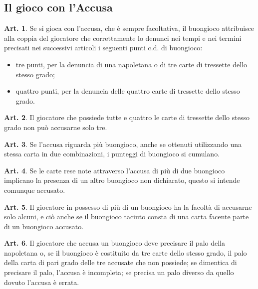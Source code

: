 \documentclass[italian,a4paper]{article}
\theoremstyle{definition}
\newtheorem{art}{Art.}
\begin{document}
\subsection{Il gioco con l'Accusa}
\begin{art}
Se si gioca con l'accusa, che è sempre facoltativa, il buongioco attribuisce alla coppia del giocatore che correttamente lo denunci nei tempi e nei termini precisati nei successivi articoli i seguenti punti c.d. di buongioco:
\begin{itemize}
\item    tre punti, per la denuncia di una napoletana o di tre carte di tressette dello stesso grado;
\item    quattro punti, per la denuncia delle quattro carte di tressette dello stesso grado.
    \end{itemize}
\end{art}
\begin{art}
Il giocatore che possiede tutte e quattro le carte di tressette dello stesso grado non può accusarne solo tre.
\end{art}
\begin{art}
Se l'accusa riguarda più buongioco, anche se ottenuti utilizzando una stessa carta in due combinazioni, i punteggi di buongioco si cumulano.
\end{art}
\begin{art}
Se le carte rese note attraverso l'accusa di più di due buongioco implicano la presenza di un altro buongioco non dichiarato, questo si intende comunque accusato.
\end{art}
\begin{art}
Il giocatore in possesso di più di un buongioco ha la facoltà di accusarne solo alcuni, e ciò anche se il buongioco taciuto consta di una carta facente parte di un buongioco accusato.
\end{art}
\begin{art}
Il giocatore che accusa un buongioco deve precisare il palo della napoletana o, se il buongioco è costituito da tre carte dello stesso grado, il palo della carta di pari grado delle tre accusate che non possiede; se dimentica di precisare il palo, l'accusa è incompleta; se precisa un palo diverso da quello dovuto l'accusa è errata.
\end{art}
\end{document}
